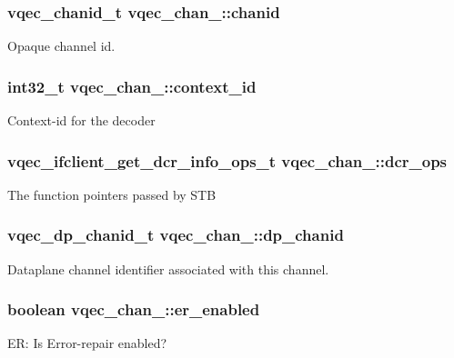 \subsubsection{\setlength{\rightskip}{0pt plus 5cm}\bf{vqec\_\-chanid\_\-t} \bf{vqec\_\-chan\_\-::chanid}}\label{structvqec__chan___71925ec4cd7279aaffe991537dae0b4c}


Opaque channel id. 
\subsubsection{\setlength{\rightskip}{0pt plus 5cm}int32\_\-t \bf{vqec\_\-chan\_\-::context\_\-id}}\label{structvqec__chan___95aa607cf594ea21594eedd49acbcce4}


Context-id for the decoder 
\subsubsection{\setlength{\rightskip}{0pt plus 5cm}\bf{vqec\_\-ifclient\_\-get\_\-dcr\_\-info\_\-ops\_\-t} \bf{vqec\_\-chan\_\-::dcr\_\-ops}}\label{structvqec__chan___e7a4556f84e9e02d9504316f2129be13}


The function pointers passed by STB 
\subsubsection{\setlength{\rightskip}{0pt plus 5cm}vqec\_\-dp\_\-chanid\_\-t \bf{vqec\_\-chan\_\-::dp\_\-chanid}}\label{structvqec__chan___34f225c2909889ef5cc88ad82f93122b}


Dataplane channel identifier associated with this channel. 
\subsubsection{\setlength{\rightskip}{0pt plus 5cm}boolean \bf{vqec\_\-chan\_\-::er\_\-enabled}}\label{structvqec__chan___7be709a661778c133766fecccd15774e}


ER: Is Error-repair enabled? 
